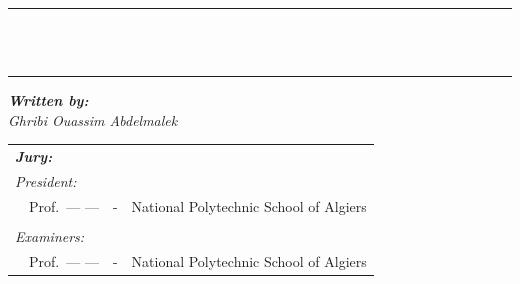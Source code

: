 {\begin{titlepage}
    \vspace{5mm}

    \center


    \vspace{2mm}


    \vspace{2mm}


    \vspace{5mm}

    \begin{bfseries}
        \rule{\linewidth}{1pt} \\
        \vspace{5mm}
         \\
        \vspace{5mm}
        \rule{\linewidth}{1pt}
    \end{bfseries}

    \begin{flushleft}
        \textit{\textbf{Written by:}}      \\
        \textit{Ghribi Ouassim Abdelmalek} \\
    \end{flushleft}

    \begin{center}
        \noindent \large
        \begin{tabular}{llcl}
            \textit{\textbf{Jury:}}                                &   &                                        & \\
            \textit{President:}                                    &   &                                        & \\
            \multicolumn{2}{l}{~~Prof.\  --- \textsc{---}}         & - & National Polytechnic School of Algiers   \\

            \\
            \textit{Examiners:}                                    &   &                                        & \\
            \multicolumn{2}{l}{~~Prof.\ --- \textsc{---}}          & - & National Polytechnic School of Algiers   \\


\end{tabular}
\end{center}
\end{titlepage}}
